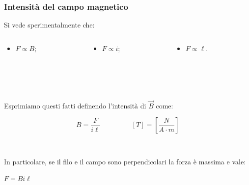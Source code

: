 \documentclass[]{beamer}
\theoremstyle{plain}
\begin{document}
\begin{frame}
\frametitle{Intensità del campo magnetico}
Si vede sperimentalmente che:
\begin{columns}
\begin{column}{0.3\textwidth}
\begin{itemize}
  \item $ F \propto B $;
\end{itemize}
\end{column}
\begin{column}{0.3\textwidth}
\begin{itemize}
  \item $ F \propto i $;
\end{itemize}
\end{column}
\begin{column}{0.3\textwidth}
\begin{itemize}
  \item $ F \propto \ell $.
\end{itemize}
\end{column}
\end{columns}\pause

~

~

Esprimiamo questi fatti definendo l'intensità di $ \vec{B} $ come:
\begin{center}
~~~~~~~~~~~~~~~~~~~~~\colorbox{marroncino!30}{$ B = \dfrac{F}{i\ell} $}\pause~~~~~~~~~$ \left[ T \right] = \left[ \dfrac{N}{A\cdot m} \right] $
\end{center}\pause

~

In particolare, \alert<4>{se il filo e il campo sono perpendicolari la forza è massima e vale:}
\begin{center}
\colorbox{marroncino!30}{$ F=Bi\ell $}
\end{center}
\end{frame}
\end{document}
